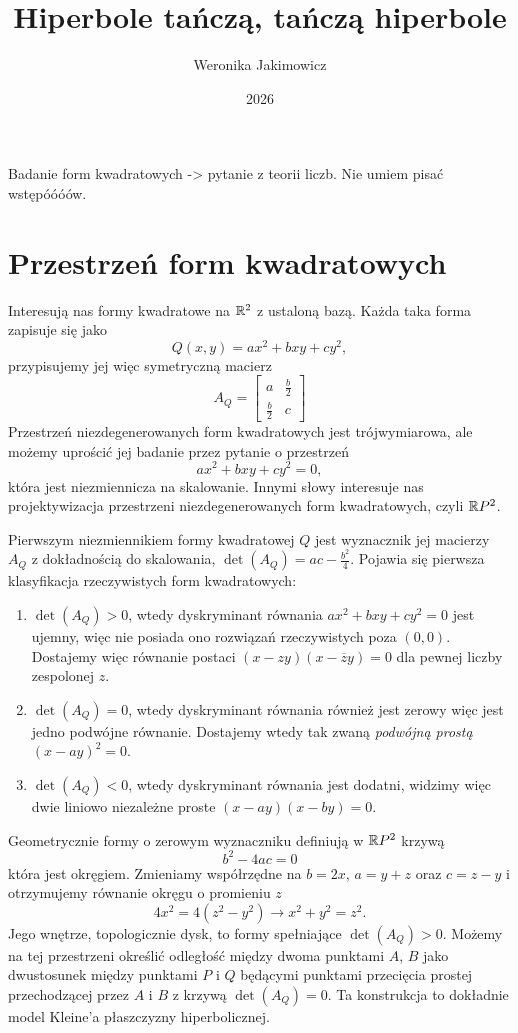 \documentclass[a4paper, 12pt]{article}
\title{Hiperbole tańczą, tańczą hiperbole}
\author{\color{subtext1}Weronika Jakimowicz}
\date{2026}
\begin{document}
\maketitle
\thispagestyle{empty}

Badanie form kwadratowych -> pytanie z teorii liczb. Nie umiem pisać wstępóóóów.

\section{Przestrzeń form kwadratowych}

Interesują nas formy kwadratowe na $\mathbb{R}^2$ z ustaloną bazą. Każda taka forma zapisuje się jako
$$Q(x,y)=ax^2+bxy+cy^2,$$
przypisujemy jej więc symetryczną macierz
$$A_Q=\begin{bmatrix}
  a & \frac{b}{2} \\ 
  \frac{b}{2} & c
\end{bmatrix}$$
Przestrzeń niezdegenerowanych form kwadratowych jest trójwymiarowa, ale możemy uprościć jej badanie przez pytanie o przestrzeń
$$ax^2+bxy+cy^2=0,$$
która jest niezmiennicza na skalowanie. Innymi słowy interesuje nas projektywizacja przestrzeni niezdegenerowanych form kwadratowych, czyli $\mathbb{R} P^2$.

Pierwszym niezmiennikiem formy kwadratowej $Q$ jest wyznacznik jej macierzy $A_Q$ z dokładnością do skalowania, $\det(A_Q)=ac-\frac{b^2}{4}$. Pojawia się pierwsza klasyfikacja rzeczywistych form kwadratowych:
\begin{enumerate}
  \item $\det(A_Q)>0$, wtedy dyskryminant równania $ax^2+bxy+cy^2=0$ jest ujemny, więc nie posiada ono rozwiązań rzeczywistych poza $(0,0)$. Dostajemy więc równanie postaci $(x-zy)(x-\overline{z}y)=0$ dla pewnej liczby zespolonej $z$. 
  \item $\det(A_Q)=0$, wtedy dyskryminant równania również jest zerowy więc jest jedno podwójne równanie. Dostajemy wtedy tak zwaną \emph{podwójną prostą} $(x-ay)^2=0$.
  \item $\det(A_Q)<0$, wtedy dyskryminant równania jest dodatni, widzimy więc dwie liniowo niezależne proste $(x-ay)(x-by)=0$.
\end{enumerate}

Geometrycznie formy o zerowym wyznaczniku definiują w $\mathbb{R} P^2$ krzywą
$$b^2-4ac=0$$
która jest okręgiem. Zmieniamy współrzędne na $b=2x$, $a=y+z$ oraz $c=z-y$ i otrzymujemy równanie okręgu o promieniu $z$
$$4x^2=4(z^2-y^2)\to x^2+y^2=z^2.$$
Jego wnętrze, topologicznie dysk, to formy spełniające $\det(A_Q)>0$. Możemy na tej przestrzeni określić odległość między dwoma punktami $A$, $B$ jako dwustosunek między punktami $P$ i $Q$ będącymi punktami przecięcia prostej przechodzącej przez $A$ i $B$ z krzywą $\det(A_Q)=0$. Ta konstrukcja to dokładnie model Kleine'a płaszczyzny hiperbolicznej.
\end{document}
